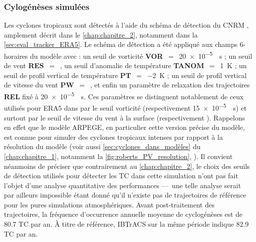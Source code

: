 \documentclass[../main.tex]{subfiles}
\begin{document}
\subsubsection{Cylogénèses simulées}\label{sec:tracking_arpege}

Les cyclones tropicaux sont détectés à l'aide du schéma de détection du CNRM \parencite{chauvin_response_2006}, amplement décrit dans le \cref{chap:chapitre_2},
notamment dans la \cref{sec:eval_tracker_ERA5}. Le schéma de détection a été appliqué aux champs 6-horaires du modèle avec : un seuil de vorticité
\textbf{VOR}~$=$~\SI{20e-5}{\per\second} ; un seuil de vent \textbf{RES}~$=$~, un seuil d'anomalie de température \textbf{TANOM}~$=$~\SI{1}{\kelvin} ; un
seuil de profil vertical de température \textbf{PT}~$=$~\SI{-2}{\kelvin} ; un seuil de profil vertical de vitesse du vent \textbf{PW}~$=$~, et enfin un
paramètre de relaxation des trajectoires \textbf{REL} fixé à \SI{20e-5}{\per\second}. Ces paramètres se distinguent notablement de ceux utilisés pour ERA5 dans
\textcite{dulac_assessing_2023} par le seuil vorticité (respectivement \SI{15e-5}{\per\second}) et surtout par le seuil de vitesse du vent à la surface
(respectivement ). Rappelons en effet que le modèle ARPEGE, en particulier cette version précise du modèle, est connue pour simuler des cyclones tropicaux
intenses par rapport à la résolution du modèle \parencite{roberts_impact_2020,chauvin_future_2020} (voir aussi \cref{sec:cyclones_dans_modèles} du
\cref{chap:chapitre_1}, notamment la \cref{fig:roberts_PV_resolution}, ). Il convient néanmoins de préciser que
contrairement au \cref{chap:chapitre_2}, le choix des seuils de détection utilisés pour détecter les TC dans cette simulation n'ont pas fait l'objet d'une
analyse quantitative des performances ---~une telle analyse serait par ailleurs impossible étant donné qu'il n'existe pas de trajectoires de référence pour les
pures simulations atmosphériques. Avant post-traitement des trajectoires, la fréquence d'occurrence annuelle moyenne de cyclogénèses est de \num{80.7} TC par
an. À titre de référence, IBTrACS sur la même période indique \num{82.9} TC par an.
\end{document}
